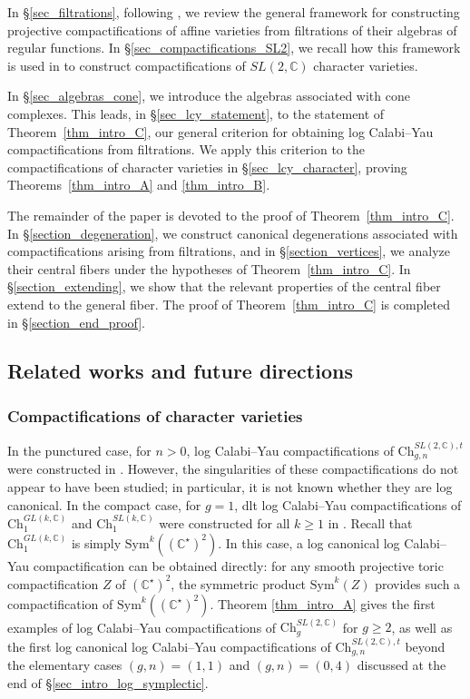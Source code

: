 \documentclass[12pt,letterpaper, reqno]{amsart}
\theoremstyle{defstyle} \newtheorem{definition}[theorem]{Definition}
\theoremstyle{remark}
\numberwithin{equation}{section}
\numberwithin{figure}{section}
\newcommand{\CC} {\mathbb{C}}
\begin{document}
In \S\ref{sec_filtrations}, following \cite{mondal2014projective}, we review the general framework for constructing projective compactifications of affine varieties from filtrations of their algebras of regular functions. In \S\ref{sec_compactifications_SL2}, we recall how this framework is used in \cite{ayilliath2025geometric, farajzadeh2023compactifications} to construct compactifications of $SL(2,\CC)$ character varieties.

In \S\ref{sec_algebras_cone}, we introduce the algebras associated with cone complexes. This leads, in \S\ref{sec_lcy_statement}, to the statement of Theorem~\ref{thm_intro_C}, our general criterion for obtaining log Calabi--Yau compactifications from filtrations. We apply this criterion to the compactifications of character varieties in \S\ref{sec_lcy_character}, proving Theorems~\ref{thm_intro_A} and \ref{thm_intro_B}.

The remainder of the paper is devoted to the proof of Theorem~\ref{thm_intro_C}. In \S\ref{section_degeneration}, we construct canonical degenerations associated with compactifications arising from filtrations, and in \S\ref{section_vertices}, we analyze their central fibers under the hypotheses of Theorem~\ref{thm_intro_C}. In \S\ref{section_extending}, we show that the relevant properties of the central fiber extend to the general fiber. The proof of Theorem~\ref{thm_intro_C} is completed in \S\ref{section_end_proof}.


\subsection{Related works and future directions}

\subsubsection{Compactifications of character varieties}

In the punctured case, for $n>0$, log Calabi--Yau compactifications of $\mathrm{Ch}_{g,n}^{SL(2,\CC),t}$ were constructed in \cite{MR4157427}. However, the singularities of these compactifications do not appear to have been studied; in particular, it is not known whether they are log canonical.
In the compact case, for $g=1$, dlt log Calabi--Yau compactifications of $\mathrm{Ch}_1^{GL(k,\CC)}$ and $\mathrm{Ch}_1^{SL(k,\CC)}$ were constructed for all $k\geq 1$ in \cite[Theorem B]{mauri2022geometric}. Recall that $\mathrm{Ch}_1^{GL(k,\CC)}$ is simply $\mathrm{Sym}^k((\CC^\star)^2)$. In this case, a log canonical log Calabi--Yau compactification can be obtained directly: for any smooth projective toric compactification $Z$ of $(\CC^\star)^2$, the symmetric product $\mathrm{Sym}^k(Z)$ provides such a compactification of $\mathrm{Sym}^k((\CC^\star)^2)$.
Theorem \ref{thm_intro_A} gives the first examples of log Calabi--Yau compactifications of $\mathrm{Ch}_g^{SL(2,\CC)}$ for $g\geq 2$, as well as the first log canonical log Calabi--Yau compactifications of $\mathrm{Ch}_{g,n}^{SL(2,\CC),t}$ beyond the elementary cases $(g,n)=(1,1)$ and $(g,n)=(0,4)$ discussed at the end of \S\ref{sec_intro_log_symplectic}.
\end{document}

